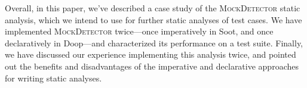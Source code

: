 Overall, in this paper, we've described a case study of the \textsc{MockDetector} static analysis, which we intend to use for further static analyses of test cases. We have implemented \textsc{MockDetector} twice---once imperatively in Soot, and once declaratively in Doop---and characterized its performance on a test suite. Finally, we have discussed our experience implementing this analysis twice, and pointed out the benefits and disadvantages of the imperative and declarative approaches for writing static analyses.






